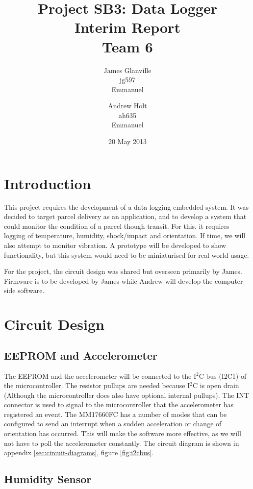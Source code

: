 \documentclass[a4paper,11pt]{article}  %
\title{Project SB3: Data Logger \\
       Interim Report \\
       Team 6}
\author{James Glanville\\
        jg597\\
        Emmanuel\\
        \and
        Andrew Holt\\
        ah635\\
        Emmanuel}
\date{20 May 2013}
\begin{document}
\maketitle

\section{Introduction}

This project requires the development of a data logging embedded
system. It was decided to target parcel delivery as an application,
and to develop a system that could monitor the condition of a parcel
though transit. For this, it requires logging of temperature,
humidity, shock/impact and orientation. If time, we will also attempt
to monitor vibration. A prototype will be developed to show
functionality, but this system would need to be miniaturised for
real-world usage.

For the project, the circuit design was shared but overseen
primarily by James. Firmware is to be developed by James while Andrew
will develop the computer side software.

\section{Circuit Design}

\subsection{EEPROM and Accelerometer}

The EEPROM and the accelerometer will be connected to the I$^2$C bus
(I2C1) of the microcontroller. The resistor pullups are needed
because I$^2$C is open drain (Although the microcontroller does also have
optional internal pullups). The INT connector is used to signal to the
microcontroller that the accelerometer has registered an event. The
MM17660FC has a number of modes that can be configured to send an
interrupt when a sudden acceleration or change of orientation has
occurred. This will make the software more effective, as we will not
have to poll the accelerometer constantly. The circuit diagram is
shown in appendix \ref{sec:circuit-diagrams}, figure \ref{fig:i2cbus}.

\subsection{Humidity Sensor}
\end{document}
